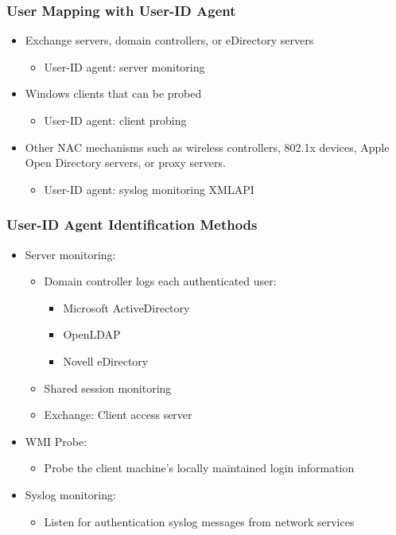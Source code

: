 \subsubsection{User Mapping with User-ID Agent}
\begin{itemize}
    \item Exchange servers, domain controllers, or eDirectory servers
        \begin{itemize}
            \item User-ID agent: server monitoring
        \end{itemize}
    \item Windows clients that can be probed
        \begin{itemize}
            \item User-ID agent: client probing
        \end{itemize}
    \item Other NAC mechanisms such as wireless controllers, 802.1x devices, Apple Open Directory servers, or proxy servers.
        \begin{itemize}
            \item User-ID agent: syslog monitoring XMLAPI
        \end{itemize}
\end{itemize}

\subsubsection{User-ID Agent Identification Methods}
\begin{itemize}
    \item Server monitoring:
        \begin{itemize}
            \item Domain controller logs each authenticated user:
                \begin{itemize}
                    \item Microsoft ActiveDirectory
                    \item OpenLDAP
                    \item Novell eDirectory
                \end{itemize}
            \item Shared session monitoring
            \item Exchange: Client access server
        \end{itemize}
    \item WMI Probe:
        \begin{itemize}
            \item Probe the client machine's locally maintained login information
        \end{itemize}
    \item Syslog monitoring:
        \begin{itemize}
            \item Listen for authentication syslog messages from network services
        \end{itemize}
\end{itemize}

